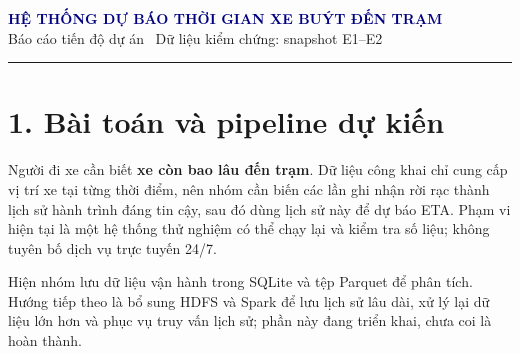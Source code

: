 \documentclass[10pt,a4paper]{article}
\begin{document}
\begin{center}
  {\Large\bfseries\textcolor{navy}{HỆ THỐNG DỰ BÁO THỜI GIAN XE BUÝT ĐẾN TRẠM}}\\[-1pt]
  {\small Báo cáo tiến độ dự án \enspace\textbar\enspace\ Dữ liệu kiểm chứng: snapshot E1--E2}
\end{center}
\vspace{2pt}\hrule\vspace{5pt}

\section*{1. Bài toán và pipeline dự kiến}
Người đi xe cần biết \textbf{xe còn bao lâu đến trạm}. Dữ liệu công khai chỉ cung cấp vị trí xe tại từng thời điểm, nên nhóm cần biến các lần ghi nhận rời rạc thành lịch sử hành trình đáng tin cậy, sau đó dùng lịch sử này để dự báo ETA. Phạm vi hiện tại là một hệ thống thử nghiệm có thể chạy lại và kiểm tra số liệu; không tuyên bố dịch vụ trực tuyến 24/7.

\begin{center}
\end{center}
\vspace{-2pt}
Hiện nhóm lưu dữ liệu vận hành trong SQLite và tệp Parquet để phân tích. Hướng tiếp theo là bổ sung HDFS và Spark để lưu lịch sử lâu dài, xử lý lại dữ liệu lớn hơn và phục vụ truy vấn lịch sử; phần này đang triển khai, chưa coi là hoàn thành.
\end{document}
